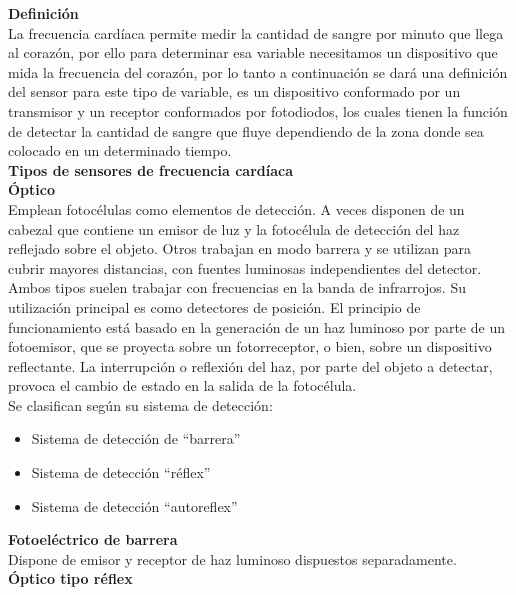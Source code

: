\textbf{Definición} \\

La frecuencia cardíaca permite medir la cantidad de sangre por minuto que llega al corazón, por ello para determinar esa variable necesitamos un dispositivo que mida la frecuencia del corazón, por lo tanto a continuación se dará una definición del sensor para este tipo de variable, es un dispositivo conformado por un transmisor y un receptor conformados por fotodiodos, los cuales tienen la función de detectar la cantidad de sangre que fluye dependiendo de la zona donde sea colocado en un determinado tiempo. \\

\textbf{Tipos de sensores de frecuencia cardíaca} \\ 

\textbf{Óptico} \\

Emplean fotocélulas como elementos de detección. A veces disponen de un cabezal que contiene un emisor de luz y la fotocélula de detección del haz reflejado sobre el objeto. Otros trabajan en modo barrera y se utilizan para cubrir mayores distancias, con fuentes luminosas independientes del detector. Ambos tipos suelen trabajar con frecuencias en la banda de infrarrojos. Su utilización principal es como detectores de posición. El principio de funcionamiento está basado en la generación de un haz luminoso por parte de un fotoemisor, que se proyecta sobre un fotorreceptor, o bien, sobre un dispositivo reflectante. La interrupción o reflexión del haz, por parte del objeto a detectar, provoca el cambio de estado en la salida de la fotocélula. \\

Se clasifican según su sistema de detección: 

\begin{itemize}
	\item Sistema de detección de “barrera”
	\item Sistema de detección “réflex” 
	\item Sistema de detección “autoreflex”	
\end{itemize}

\textbf{Fotoeléctrico de barrera} \\

Dispone de emisor y receptor de haz luminoso dispuestos separadamente. \\

\textbf{Óptico tipo réflex} \\

